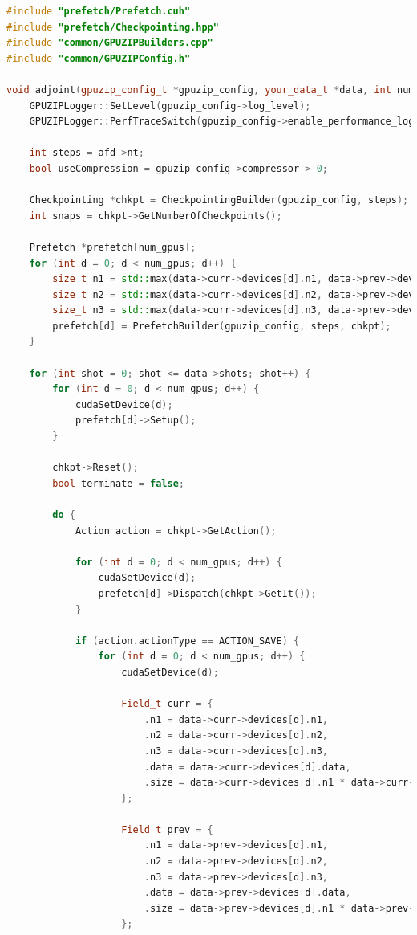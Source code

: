 \documentclass[Ingles]{ic-tese-v3}
\begin{document}
\begin{lstlisting}[language=C++, caption={Example of multi-GPU adjoint computation with GPUZIP}, label={lst:adjoint}]
#include "prefetch/Prefetch.cuh"
#include "prefetch/Checkpointing.hpp"
#include "common/GPUZIPBuilders.cpp"
#include "common/GPUZIPConfig.h"

void adjoint(gpuzip_config_t *gpuzip_config, your_data_t *data, int num_gpus) {
    GPUZIPLogger::SetLevel(gpuzip_config->log_level);
    GPUZIPLogger::PerfTraceSwitch(gpuzip_config->enable_performance_log);

    int steps = afd->nt;
    bool useCompression = gpuzip_config->compressor > 0;

    Checkpointing *chkpt = CheckpointingBuilder(gpuzip_config, steps);
    int snaps = chkpt->GetNumberOfCheckpoints();

    Prefetch *prefetch[num_gpus];
    for (int d = 0; d < num_gpus; d++) {
        size_t n1 = std::max(data->curr->devices[d].n1, data->prev->devices[d].n1);
        size_t n2 = std::max(data->curr->devices[d].n2, data->prev->devices[d].n2);
        size_t n3 = std::max(data->curr->devices[d].n3, data->prev->devices[d].n3);
        prefetch[d] = PrefetchBuilder(gpuzip_config, steps, chkpt); 
    }

    for (int shot = 0; shot <= data->shots; shot++) {
        for (int d = 0; d < num_gpus; d++) {
            cudaSetDevice(d);
            prefetch[d]->Setup();
        }

        chkpt->Reset();
        bool terminate = false;

        do {
            Action action = chkpt->GetAction();

            for (int d = 0; d < num_gpus; d++) {
                cudaSetDevice(d);
                prefetch[d]->Dispatch(chkpt->GetIt());
            }

            if (action.actionType == ACTION_SAVE) {
                for (int d = 0; d < num_gpus; d++) {
                    cudaSetDevice(d);

                    Field_t curr = {
                        .n1 = data->curr->devices[d].n1,
                        .n2 = data->curr->devices[d].n2,
                        .n3 = data->curr->devices[d].n3,
                        .data = data->curr->devices[d].data,
                        .size = data->curr->devices[d].n1 * data->curr->devices[d].n2 * data->curr->devices[d].n3 * sizeof(float)
                    };

                    Field_t prev = {
                        .n1 = data->prev->devices[d].n1,
                        .n2 = data->prev->devices[d].n2,
                        .n3 = data->prev->devices[d].n3,
                        .data = data->prev->devices[d].data,
                        .size = data->prev->devices[d].n1 * data->prev->devices[d].n2 * data->prev->devices[d].n3 * sizeof(float)
                    };


\end{lstlisting}
\end{document}
